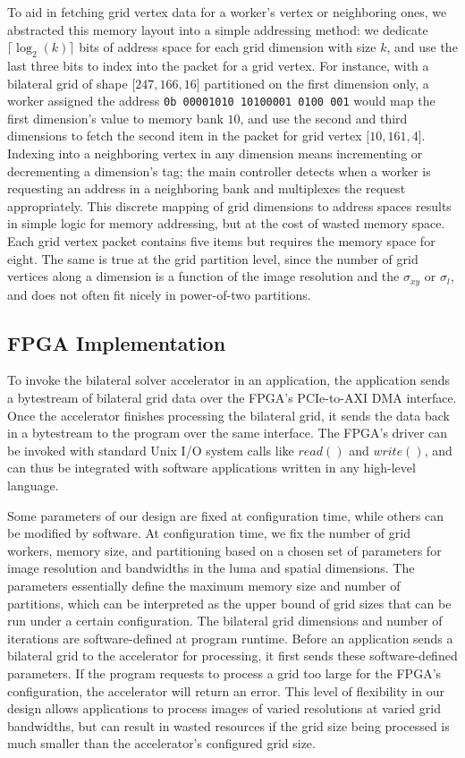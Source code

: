 To aid in fetching grid vertex data for a worker's vertex or neighboring ones, we abstracted this memory layout into a simple addressing method: we dedicate $\lceil\log_2(k)\rceil$ bits of address space for each grid dimension with size  $k$, and use the last three bits to index into the packet for a grid vertex.
For instance, with a bilateral grid of shape $\big[ 247, 166, 16\big]$ partitioned on the first dimension only, a worker assigned the address \texttt{0b 00001010 10100001 0100 001} would map the first dimension's value to memory bank $10$, and use the second and third dimensions to fetch the second item in the packet for grid vertex $\big[ 10, 161, 4\big]$.
Indexing into a neighboring vertex in any dimension means incrementing or decrementing a dimension's tag; the main controller detects when a worker is requesting an address in a neighboring bank and multiplexes the request appropriately.
This discrete mapping of grid dimensions to address spaces results in simple logic for memory addressing, but at the cost of wasted memory space.
Each grid vertex packet contains five items but requires the memory space for eight.
The same is true at the grid partition level, since the number of grid vertices along a dimension is a function of the image resolution and the $\sigma_{xy}$ or $\sigma_{l}$, and does not often fit nicely in power-of-two partitions.



\subsection{FPGA Implementation}

To invoke the bilateral solver accelerator in an application, the application sends a bytestream of bilateral grid data over the FPGA's PCIe-to-AXI DMA interface.
Once the accelerator finishes processing the bilateral grid, it sends the data back in a bytestream to the program over the same interface.
The FPGA's driver can be invoked with standard Unix I/O system calls like $read()$ and $write()$, and can thus be integrated with software applications written in any high-level language.

Some parameters of our design are fixed at configuration time, while others can be modified by software.
At configuration time, we fix the number of grid workers, memory size, and partitioning based on a chosen set of parameters for image resolution and bandwidths in the luma and spatial dimensions.
The parameters essentially define the maximum memory size and number of partitions, which can be interpreted as the upper bound of grid sizes that can be run under a certain configuration.
The bilateral grid dimensions and number of iterations are software-defined at program runtime.
Before an application sends a bilateral grid to the accelerator for processing, it first sends these software-defined parameters.
If the program requests to process a grid too large for the FPGA's configuration, the accelerator will return an error.
This level of flexibility in our design allows applications to process images of varied resolutions at varied grid bandwidths, but can result in wasted resources if the grid size being processed is much smaller than the accelerator's configured grid size.
